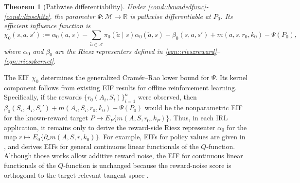 \documentclass[12pt]{article}
\theoremstyle{plain}
\newtheorem{theorem}{Theorem}
\begin{document}
 


 


\begin{theorem}[Pathwise differentiability]  \label{theorem::EIF}
    Under \ref{cond::boundedfunc}-\ref{cond::lipschitz}, the parameter
    \(\Psi: \mathcal{M} \to \mathbb{R}\) is pathwise differentiable at \(P_0\).
    Its efficient influence function is
    \[
    \chi_0(s,a,s')
    := \alpha_0(a,s)
    - \sum_{\tilde a \in \mathcal{A}} \pi_0(\tilde a \mid s)\alpha_0(\tilde a, s)
    + \beta_0(s,a,s')
    + m(a, s, r_0, k_0)
    - \Psi(P_0),
    \]
    where \(\alpha_0\) and \(\beta_0\) are the Riesz representers defined in
    \eqref{eqn::rieszreward}--\eqref{eqn::rieszkernel}.
\end{theorem}
\noindent The EIF \(\chi_0\) determines the generalized Cramér--Rao lower
bound for \(\Psi\). Its kernel component follows from existing EIF results for
offline reinforcement learning. Specifically, if the rewards
\(\{r_0(A_i,S_i)\}_{i=1}^n\) were observed, then
\(\beta_0(S_i,A_i,S_i')+m(A_i,S_i,r_0,k_0)-\Psi(P_0)\) would be the
nonparametric EIF for the known-reward target
\(P\mapsto E_P\{m(A,S,r_0,k_P)\}\). Thus, in each IRL application, it remains
only to derive the reward-side Riesz representer \(\alpha_0\) for the map
\(r\mapsto E_0\{\partial_r m(A,S,r,k_0)\}\). For example, EIFs for policy
values are given in
\citet{van2018online,kallus2020double,kallus2022efficiently}, and
\citet{van2025automaticDRL} derives EIFs for general continuous linear
functionals of the \(Q\)-function. Although those works allow additive reward
noise, the EIF for continuous linear functionals of the \(Q\)-function is
unchanged because the reward-noise score is orthogonal to the target-relevant
tangent space \citep{bickel1993efficient,laan2003unified}.
\end{document}

